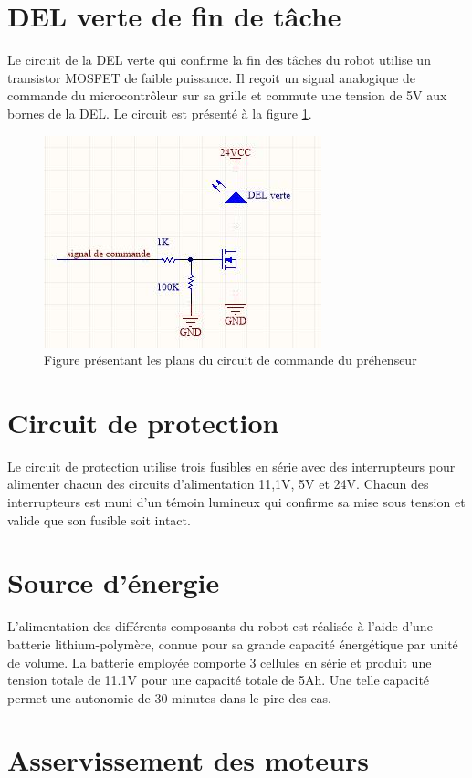 \section{DEL verte de fin de tâche}
Le circuit de la DEL verte qui confirme la fin des tâches du robot utilise un transistor MOSFET de faible puissance. Il reçoit un signal analogique de commande du microcontrôleur sur sa grille et commute une tension de 5V aux bornes de la DEL. Le circuit est présenté à la figure \ref{fig:del_verte}.

\begin{figure}[htbp]
\centering
\includegraphics[scale=0.5]{fig/del_verte.jpg}
\caption{Figure présentant les plans du circuit de commande du préhenseur}
\label{fig:del_verte}
\end{figure}

\section{Circuit de protection}
Le circuit de protection utilise trois fusibles en série avec des interrupteurs pour alimenter chacun des circuits d’alimentation 11,1V, 5V et 24V. Chacun des interrupteurs est muni d’un témoin lumineux qui confirme sa mise sous tension et valide que son fusible soit intact.

\section{Source d'énergie}
L'alimentation des différents composants du robot est réalisée à l'aide d'une batterie lithium-polymère, connue pour sa grande capacité énergétique par unité de volume. La batterie employée comporte 3 cellules en série et produit une tension totale de 11.1V pour une capacité totale de 5Ah. Une telle capacité permet une autonomie de 30 minutes dans le pire des cas.


\section{Asservissement des moteurs}
